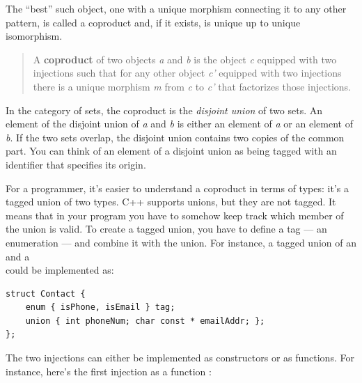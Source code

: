 \begin{figure}[H]
\centering
{}
\end{figure}

\noindent
The ``best'' such object, one with a unique morphism connecting it to
any other pattern, is called a coproduct and, if it exists, is unique up
to unique isomorphism.

\begin{quote}
A \textbf{coproduct} of two objects \emph{a} and \emph{b} is the object
\emph{c} equipped with two injections such that for any other object
\emph{c'} equipped with two injections there is a unique morphism
\emph{m} from \emph{c} to \emph{c'} that factorizes those injections.
\end{quote}

\noindent
In the category of sets, the coproduct is the \emph{disjoint union} of
two sets. An element of the disjoint union of \emph{a} and \emph{b} is
either an element of \emph{a} or an element of \emph{b}. If the two sets
overlap, the disjoint union contains two copies of the common part. You
can think of an element of a disjoint union as being tagged with an
identifier that specifies its origin.

For a programmer, it's easier to understand a coproduct in terms of
types: it's a tagged union of two types. C++ supports unions, but they
are not tagged. It means that in your program you have to somehow keep
track which member of the union is valid. To create a tagged union, you
have to define a tag --- an enumeration --- and combine it with the
union. For instance, a tagged union of an  and a\\
 could be implemented as:

\begin{Verbatim}
struct Contact { 
    enum { isPhone, isEmail } tag;
    union { int phoneNum; char const * emailAddr; };
};
\end{Verbatim}
The two injections can either be implemented as constructors or as
functions. For instance, here's the first injection as a function
:

